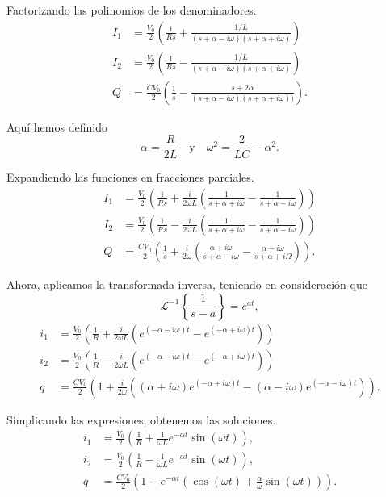 \begin{ejemplo}
    Factorizando las polinomios de los denominadores.
    \begin{align*}
        I_1 &= \frac{V_0}{2} \left(\frac{1}{Rs} + \frac{1/L}{(s+\alpha - i \omega)(s + \alpha + i \omega)} \right) \\
        I_2 &= \frac{V_0}{2} \left(\frac{1}{Rs} - \frac{1/L}{(s+\alpha - i\omega)(s+\alpha + i \omega)} \right) \\
        Q &= \frac{C V_0}{2} \left( \frac{1}{s} - \frac{s+2\alpha}{(s+\alpha - i\omega)(s+\alpha + i \omega))} \right).
    \end{align*}

    Aquí hemos definido
    $$\alpha = \frac{R}{2L} \quad \text{y} \quad \omega^2 = \frac{2}{LC} - \alpha^2.$$

    Expandiendo las funciones en fracciones parciales.
    \begin{align*}
        I_1 &= \frac{V_0}{2} \left(\frac{1}{Rs} + \frac{i}{2\omega L} \left(\frac{1}{s+\alpha + i\omega} - \frac{1}{s+\alpha - i\omega} \right) \right) \\
        I_2 &= \frac{V_0}{2} \left(\frac{1}{Rs} - \frac{i}{2\omega L} \left(\frac{1}{s+\alpha + i\omega} - \frac{1}{s+\alpha - i\omega} \right) \right) \\
        Q &= \frac{C V_0}{2} \left( \frac{1}{s} + \frac{i}{2\omega} \left( \frac{\alpha + i\omega}{s+\alpha - i\omega} - \frac{\alpha - i \omega}{s+\alpha +i\Omega} \right) \right).
    \end{align*}

    Ahora, aplicamos la transformada inversa, teniendo en consideración que
    $$\mathcal{L}^{-1}\left\{ \frac{1}{s-a} \right\} = e^{at},$$
     \begin{align*}
        i_1 &= \frac{V_0}{2} \left(\frac{1}{R} + \frac{i}{2\omega L} \left( e^{(-\alpha - i\omega)t} - e^{(-\alpha + i\omega)t}\right) \right) \\
        i_2 &= \frac{V_0}{2} \left(\frac{1}{R} - \frac{i}{2\omega L} \left( e^{(-\alpha - i\omega)t} - e^{(-\alpha + i \omega)t}\right) \right) \\
        q &= \frac{C V_0}{2} \left( 1 + \frac{i}{2\omega} \left( (\alpha + i\omega) e^{(-\alpha + i \omega)t} - (\alpha - i\omega)e^{(-\alpha - i\omega)t} \right) \right).
    \end{align*}

    Simplicando las expresiones, obtenemos las soluciones.
    \begin{align*}
        i_1 &= \frac{V_0}{2} \left(\frac{1}{R} + \frac{1}{\omega L} e^{-\alpha t}\sin(\omega t) \right), \\
        i_2 &= \frac{V_0}{2} \left(\frac{1}{R} - \frac{1}{\omega L} e^{-\alpha t}\sin(\omega t) \right), \\
        q &= \frac{CV_0}{2} \left( 1- e^{-\alpha t} \left( \cos(\omega t) + \frac{\alpha}{\omega} \sin(\omega t) \right)\right).
    \end{align*}
\end{ejemplo}








 
